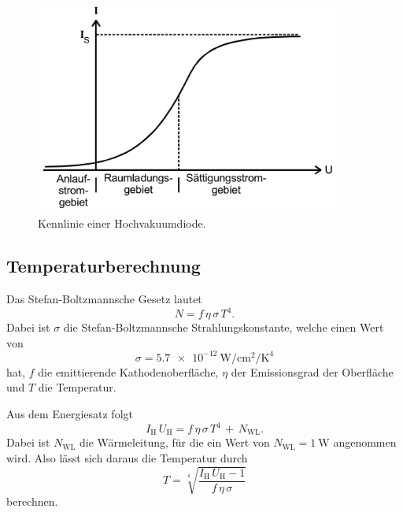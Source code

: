 \begin{figure}
    \centering
    \includegraphics[width=10cm, height=7cm]{build/gebiete.png}
    \caption{Kennlinie einer Hochvakuumdiode. \cite{V504}}
    \label{fig:gebiete}
\end{figure}


\subsection{Temperaturberechnung} %
Das Stefan-Boltzmannsche Gesetz lautet
\begin{equation*}
    N = f \, \eta \, \sigma \, T^4.
\end{equation*}
Dabei ist $\sigma$ die Stefan-Boltzmannsche Strahlungskonstante,
welche einen Wert von
\begin{equation*}
    \sigma = \SI{5.7e-12}{\watt\per\centi\meter\squared\per\kelvin\tothe{4}}
\end{equation*}
hat, $f$ die emittierende Kathodenoberfläche, $\eta$ der
Emissionsgrad der Oberfläche und $T$ die Temperatur.

\noindent Aus dem Energiesatz folgt
\begin{equation*}
    I_\text{H} \, U_\text{H} = f \, \eta \, \sigma \, T^4 \, + \, N_\text{WL}.
\end{equation*}
Dabei ist $N_\text{WL}$ die Wärmeleitung, für die ein Wert von
$N_\text{WL} = \SI{1}{\watt}$ angenommen wird.
Also lässt sich daraus die Temperatur durch
\begin{equation}
    T = \sqrt[4]{\frac{I_\text{H} \, U_\text{H} - 1}{f \, \eta \, \sigma}}
    \label{eqn:Temp}
\end{equation}
berechnen.

